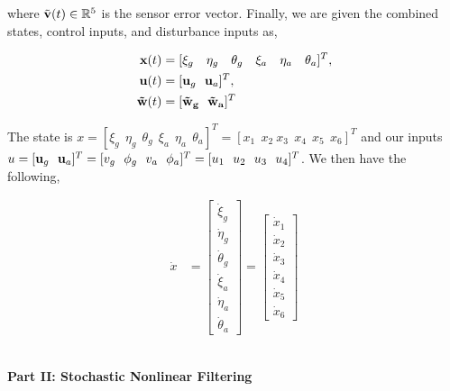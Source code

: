 \documentclass[paper=a4, fontsize=11pt]{scrartcl} %
\numberwithin{equation}{section} %
\numberwithin{figure}{section} %
\numberwithin{table}{section} %
\begin{document}
\begin{framed}
where $\Tilde{\bold{v}}(t) \in \mathbb{R}^5$ is the sensor error vector.  Finally, we are given the combined states, control inputs, and disturbance inputs as,

\begin{align*}
    \bold{x}(t) &= [ \xi_g \ \ \ \eta_g \ \ \ \theta_g \ \ \ \xi_a \ \ \ \eta_a \ \ \ \theta_a ] ^T ,\\
    \bold{u}(t) &= [ \bold{u}_g \ \ \bold{u}_a ]^T ,\\
    \bold{\Tilde{w}}(t) &= [\bold{\Tilde{w}_g \ \ \bold{\Tilde{w}}_a}]^T \\
\end{align*}

The state is $x = [\xi_g \ \  \eta_g \ \  \theta_g \ \  \xi_a \ \  \eta_a \ \ \theta_a ]^T = [ x_1 \ \ x_2 \  x_3 \ \ x_4 \ \ x_5 \ \ x_6 ]^T$ and our inputs $u = [ \bold{u}_g \ \ \bold{u}_a ]^T = [v_g \ \ \phi_g \ \ v_a \ \ \phi_a]^T = [u_1 \ \ u_2 \ \ u_3 \ \ u_4 ]^T$.  We then have the following,

\begin{align*}
    \dot{x} &= \begin{bmatrix}
           \dot{\xi}_g \\
           \dot{\eta}_g \\
           \dot{\theta}_g \\
           \dot{\xi}_a \\
           \dot{\eta}_a \\
           \dot{\theta}_a
         \end{bmatrix} 
         =  \begin{bmatrix}
           \dot{x}_1 \\
           \dot{x}_2 \\
           \dot{x}_3 \\
           \dot{x}_4 \\
           \dot{x}_5 \\
           \dot{x}_6
         \end{bmatrix} 
\end{align*}

\end{framed}


\textbf{\\ Part II: Stochastic Nonlinear Filtering }
\begin{framed}
   
\end{framed}
\end{document}
